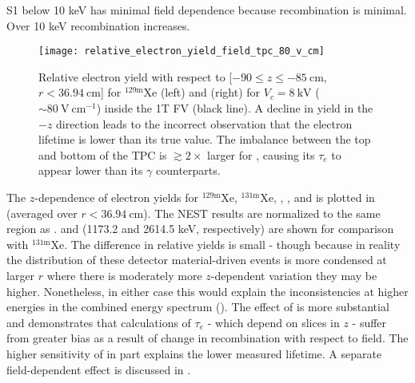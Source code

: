 S1 below 10 keV has minimal field dependence because recombination is minimal.  Over 10 keV recombination increases.

\begin{figure}
\centering
\texttt{[image: relative\_electron\_yield\_field\_tpc\_80\_v\_cm]}
\caption{Relative electron yield with respect to [$-90 \leq z \leq -85\ \mathrm{cm}$, $r < 36.94\ \mathrm{cm}$] for
$\mathrm{^{129m}Xe}$ (left) and  (right) for $V_c = 8\ \mathrm{kV}$ (${\sim}80\ \mathrm{V\ cm^{-1}}$) inside the 1T FV (black
line).  A decline in yield in the $-z$ direction leads to the incorrect observation that the electron lifetime is lower than its
true value.  The imbalance between the top
and bottom of the TPC is $\gtrsim 2\times$ larger for , causing its $\tau_e$ to appear lower than its $\gamma$ counterparts.}
\label{fig:electron_lifetimes_rn222_vs_kr83m_field_tpc}
\end{figure}

The $z$-dependence of electron yields for $\mathrm{^{129m}Xe}$, $\mathrm{^{131m}Xe}$, , , and  is
plotted in  (averaged over $r < 36.94\ \mathrm{cm}$).  The NEST results are
normalized to the same region as .   and  (1173.2 and
2614.5 keV, respectively) are shown for comparison with $\mathrm{^{131m}Xe}$.  The difference in relative yields is
small - though because in reality the distribution of these detector material-driven events is more condensed at larger $r$ where there
is moderately more $z$-dependent variation they may be higher.  Nonetheless, in either case this
would explain the inconsistencies at higher energies in the combined energy spectrum
().  The
effect of  is more substantial and demonstrates that calculations of $\tau_e$ - which depend on slices in $z$ - suffer from
greater bias as a result of change in recombination with respect to field.  The higher sensitivity of \alphadecays in part explains
the lower measured lifetime.  A separate field-dependent effect is discussed in .

